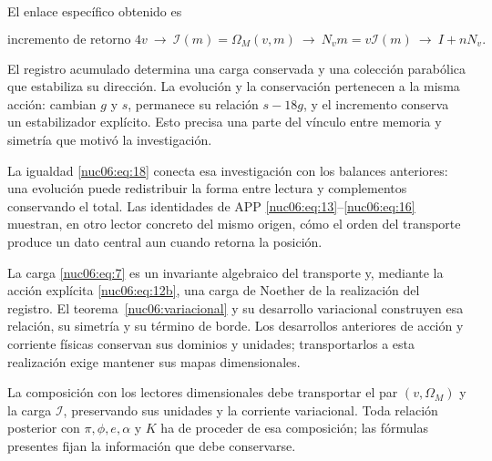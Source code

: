 El enlace específico obtenido es

\begin{equation}
\text{incremento de retorno }4v
\ \longrightarrow\ \mathcal I(m)=\Omega_M(v,m)
\ \longrightarrow\ N_vm=v\mathcal I(m)
\ \longrightarrow\ I+nN_v.
\label{nuc06:eq:21}
\end{equation}

El registro acumulado determina una carga conservada y una colección parabólica que estabiliza su dirección. La evolución y la conservación pertenecen a la misma acción: cambian \(g\) y \(s\), permanece su relación \(s-18g\), y el incremento conserva un estabilizador explícito. Esto precisa una parte del vínculo entre memoria y simetría que motivó la investigación.

La igualdad \eqref{nuc06:eq:18} conecta esa investigación con los balances anteriores: una evolución puede redistribuir la forma entre lectura y complementos conservando el total. Las identidades de APP \eqref{nuc06:eq:13}–\eqref{nuc06:eq:16} muestran, en otro lector concreto del mismo origen, cómo el orden del transporte produce un dato central aun cuando retorna la posición.

La carga \eqref{nuc06:eq:7} es un invariante algebraico del transporte y, mediante la acción explícita \eqref{nuc06:eq:12b}, una carga de Noether de la realización del registro. El teorema~\ref{nuc06:variacional} y su desarrollo variacional construyen esa relación, su simetría y su término de borde. Los desarrollos anteriores de acción y corriente físicas conservan sus dominios y unidades; transportarlos a esta realización exige mantener sus mapas dimensionales.

La composición con los lectores dimensionales debe transportar el par \((v,\Omega_M)\) y la carga \(\mathcal I\), preservando sus unidades y la corriente variacional. Toda relación posterior con \(\pi,\phi,e,\alpha\) y \(K\) ha de proceder de esa composición; las fórmulas presentes fijan la información que debe conservarse.
